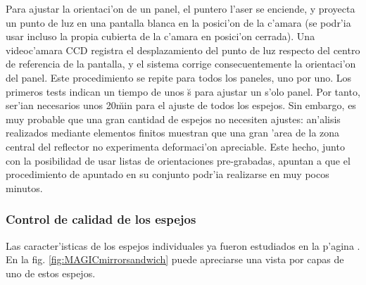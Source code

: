 Para ajustar la orientaci'on de un panel, el puntero l'aser se
enciende, y proyecta un punto de luz en una pantalla blanca en la
posici'on de la c'amara (se podr'ia usar incluso la propia cubierta de
la c'amara en posici'on cerrada). Una videoc'amara CCD registra el
desplazamiento del punto de luz respecto del centro de referencia de
la pantalla, y el sistema corrige consecuentemente la orientaci'on del
panel. Este procedimiento se repite para todos los paneles, uno por
uno.  Los primeros tests \cite{MAGIC:Wacker_Kruger} indican un tiempo
de unos \u{s} para ajustar un s'olo panel.  Por tanto, ser'ian
necesarios unos 20\u{min} para el ajuste de todos los espejos. Sin
embargo, es muy probable que una gran cantidad de espejos no
necesiten ajustes: an'alisis realizados mediante elementos finitos
muestran que una gran 'area de la zona central del reflector no
experimenta deformaci'on apreciable. Este hecho, junto con la
posibilidad de usar listas de orientaciones pre-grabadas, apuntan a
que el procedimiento de apuntado en su conjunto podr'ia realizarse en
muy pocos minutos.


\subsubsection{Control de calidad de los espejos}
%
Las caracter'isticas de los espejos individuales ya fueron estudiados
en la p'agina \pageref{label:mirrorelement}. En la fig.
\ref{fig:MAGICmirrorsandwich} puede apreciarse una vista por capas de
uno de estos espejos.

